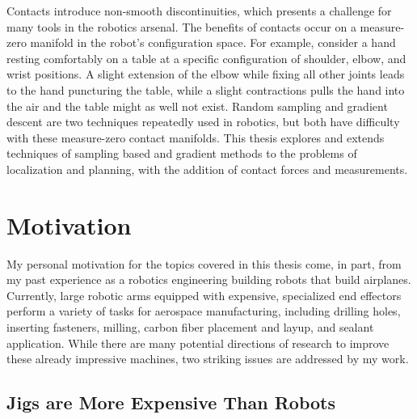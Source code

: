 \documentclass[../thesis.tex]{subfiles}
\begin{document}
Contacts introduce non-smooth discontinuities, which presents a challenge for many tools in the robotics arsenal.
The benefits of contacts occur on a measure-zero manifold in the robot's configuration space.
For example, consider a hand resting comfortably on a table at a specific configuration of shoulder, elbow, and wrist positions.
A slight extension of the elbow while fixing all other joints leads to the hand puncturing the table, while a slight contractions pulls the hand into the air and the table might as well not exist.
Random sampling and gradient descent are two techniques repeatedly used in robotics, but both have difficulty with these measure-zero contact manifolds.
This thesis explores and extends techniques of sampling based and gradient methods to the problems of localization and planning, with the addition of contact forces and measurements.




\section{Motivation}
My personal motivation for the topics covered in this thesis come, in part, from my past experience as a robotics engineering building robots that build airplanes.
Currently, large robotic arms equipped with expensive, specialized end effectors perform a variety of tasks for aerospace manufacturing, including drilling holes, inserting fasteners, milling, carbon fiber placement and layup, and sealant application.
While there are many potential directions of research to improve these already impressive machines, two striking issues are addressed by my work.

\subsection{Jigs are More Expensive Than Robots}
\end{document}
